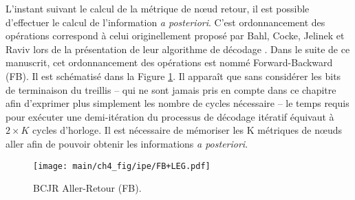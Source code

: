 L'instant suivant le calcul de la métrique de nœud retour, il est possible d'effectuer le calcul de l'information 
\textit{a posteriori}. C'est ordonnancement des opérations correspond à celui originellement proposé par Bahl, Cocke, Jelinek et Raviv lors de la présentation de leur algorithme de décodage \cite{bcjr}. Dans le suite de ce manuscrit, cet
ordonnancement des opérations est nommé Forward-Backward (FB). Il est schématisé dans la Figure \ref{fig:siso_seq}.
Il apparaît que sans considérer les bits de terminaison du treillis -- qui ne sont jamais pris en compte dans ce chapitre afin d'exprimer plus simplement les nombre de cycles nécessaire -- le temps requis pour exécuter une demi-itération du processus de décodage itératif équivaut à $2\times K$ cycles d'horloge. Il est nécessaire de mémoriser
les K métriques de nœuds aller afin de pouvoir obtenir les informations \textit{a posteriori}.

\begin{figure}[!h]
	\centering
	\texttt{[image: main/ch4\_fig/ipe/FB+LEG.pdf]}
	\caption{BCJR Aller-Retour (FB). \label{fig:siso_seq}}
\end{figure}

